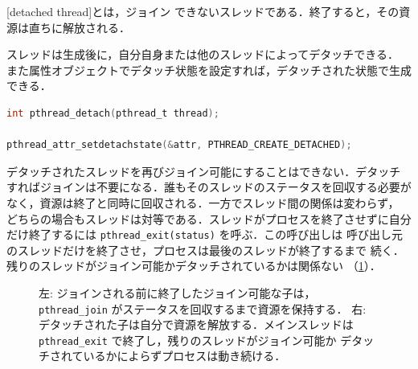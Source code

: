 \documentclass[../main.tex]{subfiles}
\begin{document}
\begin{definition}[デタッチスレッド]
  [detached thread]とは，ジョイン
  できないスレッドである．終了すると，その資源は直ちに解放される．
\end{definition}

スレッドは生成後に，自分自身または他のスレッドによってデタッチできる．
また属性オブジェクトでデタッチ状態を設定すれば，デタッチされた状態で生成
できる．
\begin{lstlisting}[language=C, numbers=none]
int pthread_detach(pthread_t thread);

pthread_attr_setdetachstate(&attr, PTHREAD_CREATE_DETACHED);
\end{lstlisting}
デタッチされたスレッドを再びジョイン可能にすることはできない．デタッチ
すればジョインは不要になる．誰もそのスレッドのステータスを回収する必要が
なく，資源は終了と同時に回収される．一方でスレッド間の関係は変わらず，
どちらの場合もスレッドは対等である．スレッドがプロセスを終了させずに自分
だけ終了するには \texttt{pthread\_exit(status)} を呼ぶ．この呼び出しは
呼び出し元のスレッドだけを終了させ，プロセスは最後のスレッドが終了するまで
続く．残りのスレッドがジョイン可能かデタッチされているかは関係ない
（\cref{fig:l04-join-detach}）．

\begin{figure}[htbp]
  \centering
  
  \caption{左: ジョインされる前に終了したジョイン可能な子は，
    \texttt{pthread\_join} がステータスを回収するまで資源を保持する．
    右: デタッチされた子は自分で資源を解放する．メインスレッドは
    \texttt{pthread\_exit} で終了し，残りのスレッドがジョイン可能か
    デタッチされているかによらずプロセスは動き続ける．}
  \label{fig:l04-join-detach}
\end{figure}
\end{document}
